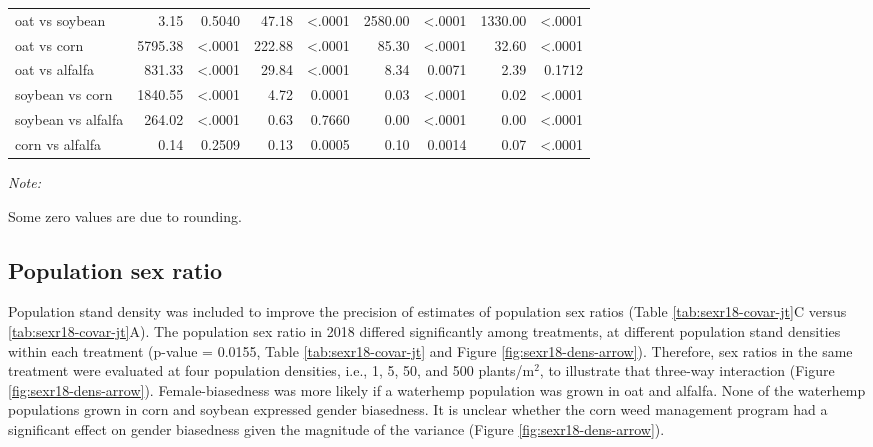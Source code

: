 \documentclass[
]{article}
\begin{document}
\begin{table}[H]
\begin{threeparttable}
\begin{tabular}[t]{lrrr>{}r|rrrr}
\hspace{1em}oat vs soybean & 3.15 & 0.5040 & 47.18 & <.0001 & 2580.00 & <.0001 & 1330.00 & <.0001\\
\hspace{1em}oat vs corn & 5795.38 & <.0001 & 222.88 & <.0001 & 85.30 & <.0001 & 32.60 & <.0001\\
\hspace{1em}oat vs alfalfa & 831.33 & <.0001 & 29.84 & <.0001 & 8.34 & 0.0071 & 2.39 & 0.1712\\
\hspace{1em}soybean vs corn & 1840.55 & <.0001 & 4.72 & 0.0001 & 0.03 & <.0001 & 0.02 & <.0001\\
\hspace{1em}soybean vs alfalfa & 264.02 & <.0001 & 0.63 & 0.7660 & 0.00 & <.0001 & 0.00 & <.0001\\
\hspace{1em}corn vs alfalfa & 0.14 & 0.2509 & 0.13 & 0.0005 & 0.10 & 0.0014 & 0.07 & <.0001\\
\bottomrule
\end{tabular}
\begin{tablenotes}[para]
\item \textit{Note: } 
\item Some zero values are due to rounding.
\end{tablenotes}
\end{threeparttable}
\end{table}

\hypertarget{population-sex-ratio-1}{%
\subsection*{Population sex ratio}\label{population-sex-ratio-1}}

Population stand density was included to improve the precision of estimates of population sex ratios (Table \ref{tab:sexr18-covar-jt}C versus \ref{tab:sexr18-covar-jt}A). The population sex ratio in 2018 differed significantly among treatments, at different population stand densities within each treatment (p-value = 0.0155, Table \ref{tab:sexr18-covar-jt} and Figure \ref{fig:sexr18-dens-arrow}). Therefore, sex ratios in the same treatment were evaluated at four population densities, i.e., 1, 5, 50, and 500 plants/m\(^2\), to illustrate that three-way interaction (Figure \ref{fig:sexr18-dens-arrow}). Female-biasedness was more likely if a waterhemp population was grown in oat and alfalfa. None of the waterhemp populations grown in corn and soybean expressed gender biasedness. It is unclear whether the corn weed management program had a significant effect on gender biasedness given the magnitude of the variance (Figure \ref{fig:sexr18-dens-arrow}).
\end{document}
